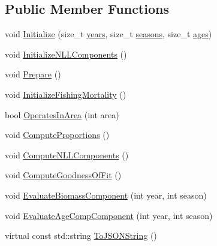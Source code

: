 \subsection*{Public Member Functions}
\begin{DoxyCompactItemize}
\item 
void \hyperlink{structmas_1_1_fleet_a179636161da4b8c126d3afd1b7ea6edd}{Initialize} (size\-\_\-t \hyperlink{structmas_1_1_fleet_a823238fd7eb794d49a64743395bf1ae5}{years}, size\-\_\-t \hyperlink{structmas_1_1_fleet_a389f70f4bb3190303aba1ae9aca8c018}{seasons}, size\-\_\-t \hyperlink{structmas_1_1_fleet_adc63e3bd51a0e1897fba4c726f7ca8f8}{ages})
\item 
void \hyperlink{structmas_1_1_fleet_a54693c200e2a03dfd1dc36cbdbfab912}{Initialize\-N\-L\-L\-Components} ()
\item 
void \hyperlink{structmas_1_1_fleet_aa131029e55eb68d71f6b65b4ddea485a}{Prepare} ()
\item 
void \hyperlink{structmas_1_1_fleet_ae1e568c71625f18513261850e4a78236}{Initialize\-Fishing\-Mortality} ()
\item 
bool \hyperlink{structmas_1_1_fleet_a1c931c611ed3b073606e95f028508703}{Operates\-In\-Area} (int area)
\item 
void \hyperlink{structmas_1_1_fleet_a2539b0783335bf2121a5c841da94d321}{Compute\-Proportions} ()
\item 
void \hyperlink{structmas_1_1_fleet_ab82761b712d8029a6cb0712e8a7964bd}{Compute\-N\-L\-L\-Components} ()
\item 
void \hyperlink{structmas_1_1_fleet_a9fd5e000daf896b61cf6bd01e5ba2bd4}{Compute\-Goodness\-Of\-Fit} ()
\item 
void \hyperlink{structmas_1_1_fleet_aa147d8f74e9976533fef4aa99b01a540}{Evaluate\-Biomass\-Component} (int year, int season)
\item 
void \hyperlink{structmas_1_1_fleet_aedb94a407107c79e0d4c134f9bba3502}{Evaluate\-Age\-Comp\-Component} (int year, int season)
\item 
virtual const std\-::string \hyperlink{structmas_1_1_fleet_a438089d58f104668621d9426fa1e1c86}{To\-J\-S\-O\-N\-String} ()
\end{DoxyCompactItemize}
